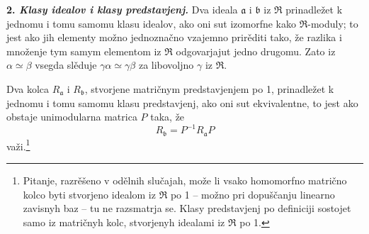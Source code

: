 \documentclass[11pt]{article}
\begin{document}
\setcounter{footnote}{24}

\textbf{2. \emph{Klasy idealov i klasy predstavjenj.}} Dva ideala $\mathfrak a$ i $\mathfrak b$ iz $\mathfrak R$ prinadležet k jednomu i tomu samomu klasu idealov, ako oni sut izomorfne kako $\mathfrak R$-moduly; to jest ako jih elementy možno jednoznačno vzajemno prirěditi tako, že razlika i množenje tym samym elementom iz $\mathfrak R$ odgovarjajut jedno drugomu. Zato iz $\alpha\simeq\beta$ vsegda slěduje $\gamma\alpha\simeq\gamma\beta$ za libovoljno $\gamma$ iz $\mathfrak R$.

Dva kolca $R_\mathfrak a$ i $R_\mathfrak b$, stvorjene matričnym predstavjenjem po 1, prinadležet k jednomu i tomu samomu klasu predstavjenj, ako oni sut ekvivalentne, to jest ako obstaje unimodularna matrica $P$ taka, že
\[
        R_\mathfrak b=P^{-1}R_\mathfrak a P
\]
važi.\footnote{Pitanje, razrěšeno v odělnih slučajah, može li vsako homomorfno matrično kolco byti stvorjeno idealom iz $\mathfrak R$ po 1 -- možno pri dopuščanju linearno zavisnyh baz -- tu ne razsmatrja se. Klasy predstavjenj po definiciji sostojet samo iz matričnyh kolc, stvorjenyh idealami iz $\mathfrak R$ po 1.}
\end{document}

